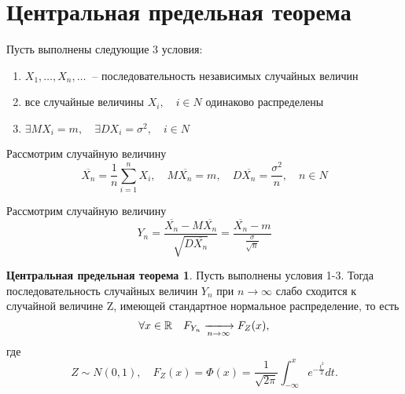 \documentclass[a4paper, 12pt]{article}
\theoremstyle{definition}
\theoremstyle{leads}
\theoremstyle{example}
\newcommand{\infseq}[3]{%
	\ensuremath{#1_#2, \dots, #1_#3, \dots}\ }
\newcommand{\infseqX}{%
	\infseq{X}{1}{n}}
\begin{document}
\section{Центральная предельная теорема}
Пусть выполнены следующие 3 условия: 
\begin{enumerate}
	\item $\infseqX$ -- последовательность независимых случайных величин
	\item все случайные величины $X_i,\quad  i \in N$ одинаково распределены
	\item $\exists MX_i = m,\quad \exists DX_i = \sigma^2, \quad i \in N$
\end{enumerate}
Рассмотрим случайную величину 
\begin{displaymath}
	\overline{X_n} = \frac{1}{n}\sum_{i=1}^{n}X_i,\quad M\overline{X_n} = m, \quad D\overline{X_n} = \frac{\sigma^2}{n},\quad n \in N
\end{displaymath}

Рассмотрим случайную величину 
\begin{displaymath}
	Y_n = \frac{\overline{X_n} - M\overline{X_n}}{\sqrt{D\overline{X_n}}} = \frac{\overline{X_n} - m}{\frac{\sigma}{\sqrt{n}}}
\end{displaymath}
\newtheorem*{cpt}{Центральная предельная теорема}
\begin{cpt}
	Пусть выполнены условия 1-3. Тогда последовательность случайных величин $Y_n$ при $n \rightarrow \infty$ слабо сходится к случайной величине Z, имеющей стандартное нормальное распределение, то есть 
	\begin{displaymath}
		\forall x \in \mathbb{R} \quad F_{Y_n} \xlongrightarrow[n \rightarrow \infty]{} F_Z(x),  
	\end{displaymath} 
где 
\begin{displaymath}
	Z \sim N(0,1), \quad F_Z(x) = \Phi(x) = \frac{1}{\sqrt{2\pi}} \int_{-\infty}^{x} e^{-\frac{t^2}{2}} dt.
\end{displaymath}
\end{cpt}
\end{document}

